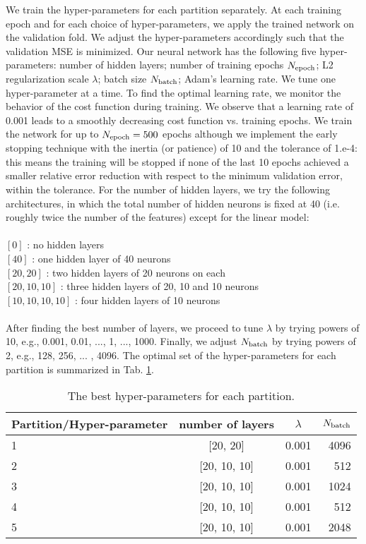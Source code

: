 \documentclass[fleqn, usenatbib]{mnras}
\begin{document}
We train the hyper-parameters for each partition separately. At each training epoch and for each choice of hyper-parameters, we apply the trained network on the validation fold. We adjust the hyper-parameters accordingly such that the validation MSE is minimized. Our neural network has the following five hyper-parameters: number of hidden layers; number of training epochs $N_{{\rm epoch}}$; L2 regularization scale $\lambda$; batch size $N_{{\rm batch}}$; Adam's learning rate. We tune one hyper-parameter at a time. To find the optimal learning rate, we monitor the behavior of the cost function during training. We observe that a learning rate of 0.001 leads to a smoothly decreasing cost function vs. training epochs. We train the network for up to $N_{\rm epoch} = 500$ epochs although we implement the early stopping technique with the inertia (or patience) of 10 and the tolerance of 1.e-4: this means the training will be stopped if none of the last 10 epochs achieved a smaller relative error reduction with respect to the minimum validation error, within the tolerance. For the number of hidden layers, we try the following architectures, in which the total number of hidden neurons is fixed at 40 (i.e. roughly twice the number of the features) except for the linear model:\\~\\
%
%
$[0]$  : no hidden layers \\
$[40]$ : one hidden layer of 40 neurons \\
$[20, 20]$ : two hidden layers of 20 neurons on each \\
$[20, 10, 10]$ : three hidden layers of 20, 10 and 10 neurons \\
$[10, 10, 10, 10]$ : four hidden layers of 10 neurons\\~\\
After finding the best number of layers, we proceed to tune $\lambda$ by trying  powers of 10, e.g., 0.001, 0.01, ..., 1, ..., 1000. Finally, we adjust $N_{\rm batch}$ by trying powers of 2, e.g., 128, 256, ... , 4096. The optimal set of the hyper-parameters for each partition is summarized in Tab. \ref{tab:hparams}.\\

\begin{table}
	\centering
	\caption{The best hyper-parameters for each partition.}
	\label{tab:hparams}
	\begin{tabular}{lccr} %
	    \hline
		\hline
		Partition/Hyper-parameter & number of layers & $\lambda$ & $N_{\rm batch}$ \\
		\hline
		1 & [20, 20] & 0.001 & 4096\\
		2 & [20, 10, 10] & 0.001 & 512\\
		3 & [20, 10, 10] & 0.001 & 1024 \\
		4 & [20, 10, 10] & 0.001 & 512 \\
		5 &  [20, 10, 10] & 0.001 & 2048\\
		\hline
		\hline
	\end{tabular}
\end{table}
\end{document}
